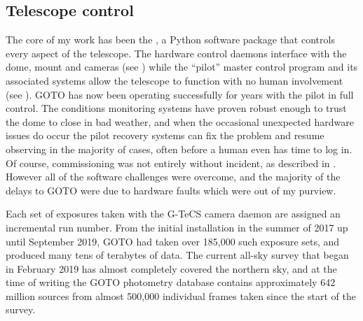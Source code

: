 \subsection{Telescope control}
\label{sec:control_results}
\begin{colsection}

The core of my work has been the , a Python software package that controls every aspect of the telescope. The hardware control daemons interface with the dome, mount and cameras (see ) while the ``pilot'' master control program and its associated systems allow the telescope to function with no human involvement (see ). GOTO has now been operating successfully for years with the pilot in full control. The conditions monitoring systems have proven robust enough to trust the dome to close in bad weather, and when the occasional unexpected hardware issues do occur the pilot recovery systems can fix the problem and resume observing in the majority of cases, often before a human even has time to log in. Of course, commissioning was not entirely without incident, as described in . However all of the software challenges were overcome, and the majority of the delays to GOTO were due to hardware faults which were out of my purview.

Each set of exposures taken with the G-TeCS camera daemon are assigned an incremental run number. From the initial installation in the summer of 2017 up until September 2019, GOTO had taken over 185,000 such exposure sets, and produced many tens of terabytes of data. The current all-sky survey that began in February 2019 has almost completely covered the northern sky, and at the time of writing the GOTO photometry database contains approximately 642 million sources from almost 500,000 individual frames taken since the start of the survey.

\newpage

\end{colsection}


